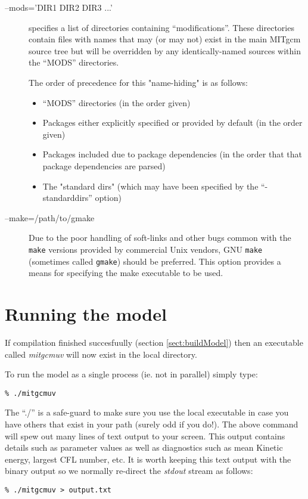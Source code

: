 \begin{description}
\item[--mods='DIR1 DIR2 DIR3 ...'] specifies a list of directories
  containing ``modifications''.  These directories contain files with
  names that may (or may not) exist in the main MITgcm source tree but
  will be overridden by any identically-named sources within the
  ``MODS'' directories.
  
  The order of precedence for this "name-hiding" is as follows:
  \begin{itemize}
  \item ``MODS'' directories (in the order given)
  \item Packages either explicitly specified or provided by default
    (in the order given)
  \item Packages included due to package dependencies (in the order
    that that package dependencies are parsed)
  \item The "standard dirs" (which may have been specified by the
    ``-standarddirs'' option)
  \end{itemize}
  
\item[--make=/path/to/gmake] Due to the poor handling of soft-links and
  other bugs common with the \texttt{make} versions provided by
  commercial Unix vendors, GNU \texttt{make} (sometimes called
  \texttt{gmake}) should be preferred.  This option provides a means
  for specifying the make executable to be used.

\end{description}



\section{Running the model}
\label{sect:runModel}

If compilation finished succesfuully (section \ref{sect:buildModel})
then an executable called {\em mitgcmuv} will now exist in the local
directory.

To run the model as a single process (ie. not in parallel) simply
type:
\begin{verbatim}
% ./mitgcmuv
\end{verbatim}
The ``./'' is a safe-guard to make sure you use the local executable
in case you have others that exist in your path (surely odd if you
do!). The above command will spew out many lines of text output to
your screen.  This output contains details such as parameter values as
well as diagnostics such as mean Kinetic energy, largest CFL number,
etc. It is worth keeping this text output with the binary output so we
normally re-direct the {\em stdout} stream as follows:
\begin{verbatim}
% ./mitgcmuv > output.txt
\end{verbatim}

